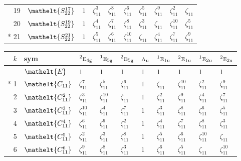 \documentclass[10pt,a4paper]{article}
\numberwithin{equation}{section}
\newcommand{\eltfont}[1]{{\let\sigma\eltsigma\mathelt{#1}}}
\newcommand{\irr}[1]{\text{\normalfont\scshape #1}}
\newcommand{\conjpair}[1]{{}^{#1}}
\newcommand{\cls}[1]{\eltfont{#1}}
\newcommand{\ptag}[1]{\mathrm{#1}}
\newcommand{\rootunity}[1]{\zeta_{#1}}
\begin{document}
{\begin{longtable}{@{}rlllllllll@{}}
19 & $\cls{S_{22}^{17}}$ & $1$ & $\rootunity{11}^{3}$ & $\rootunity{11}^{8}$ & $\rootunity{11}^{6}$ & $\rootunity{11}^{5}$ & $\rootunity{11}^{9}$ & $\rootunity{11}^{2}$ & $\rootunity{11}$\\
20 & $\cls{S_{22}^{19}}$ & $1$ & $\rootunity{11}^{4}$ & $\rootunity{11}^{7}$ & $\rootunity{11}^{8}$ & $\rootunity{11}^{3}$ & $\rootunity{11}$ & $\rootunity{11}^{10}$ & $\rootunity{11}^{5}$\\*
21 & $\cls{S_{22}^{21}}$ & $1$ & $\rootunity{11}^{5}$ & $\rootunity{11}^{6}$ & $\rootunity{11}^{10}$ & $\rootunity{11}$ & $\rootunity{11}^{4}$ & $\rootunity{11}^{7}$ & $\rootunity{11}^{9}$\\
\bottomrule\end{longtable}}
{\small\setlength{\tabcolsep}{4pt}
\begin{longtable}{@{}rlllllllll@{}}\toprule
$k$ & sym & $\conjpair{2}\irr{e}_{4\ptag{g}}$ & $\conjpair{1}\irr{e}_{5\ptag{g}}$ & $\conjpair{2}\irr{e}_{5\ptag{g}}$ & $\irr{a}_{\ptag{u}}$ & $\conjpair{1}\irr{e}_{1\ptag{u}}$ & $\conjpair{2}\irr{e}_{1\ptag{u}}$ & $\conjpair{1}\irr{e}_{2\ptag{u}}$ & $\conjpair{2}\irr{e}_{2\ptag{u}}$\\\midrule\endhead
\bottomrule\endfoot\endlastfoot
0 & $\cls{E}$ & $1$ & $1$ & $1$ & $1$ & $1$ & $1$ & $1$ & $1$\\*
1 & $\cls{C_{11}}$ & $\rootunity{11}^{7}$ & $\rootunity{11}^{5}$ & $\rootunity{11}^{6}$ & $1$ & $\rootunity{11}$ & $\rootunity{11}^{10}$ & $\rootunity{11}^{2}$ & $\rootunity{11}^{9}$\\
2 & $\cls{C_{11}^{2}}$ & $\rootunity{11}^{3}$ & $\rootunity{11}^{10}$ & $\rootunity{11}$ & $1$ & $\rootunity{11}^{2}$ & $\rootunity{11}^{9}$ & $\rootunity{11}^{4}$ & $\rootunity{11}^{7}$\\
3 & $\cls{C_{11}^{3}}$ & $\rootunity{11}^{10}$ & $\rootunity{11}^{4}$ & $\rootunity{11}^{7}$ & $1$ & $\rootunity{11}^{3}$ & $\rootunity{11}^{8}$ & $\rootunity{11}^{6}$ & $\rootunity{11}^{5}$\\
4 & $\cls{C_{11}^{4}}$ & $\rootunity{11}^{6}$ & $\rootunity{11}^{9}$ & $\rootunity{11}^{2}$ & $1$ & $\rootunity{11}^{4}$ & $\rootunity{11}^{7}$ & $\rootunity{11}^{8}$ & $\rootunity{11}^{3}$\\
5 & $\cls{C_{11}^{5}}$ & $\rootunity{11}^{2}$ & $\rootunity{11}^{3}$ & $\rootunity{11}^{8}$ & $1$ & $\rootunity{11}^{5}$ & $\rootunity{11}^{6}$ & $\rootunity{11}^{10}$ & $\rootunity{11}$\\
6 & $\cls{C_{11}^{6}}$ & $\rootunity{11}^{9}$ & $\rootunity{11}^{8}$ & $\rootunity{11}^{3}$ & $1$ & $\rootunity{11}^{6}$ & $\rootunity{11}^{5}$ & $\rootunity{11}$ & $\rootunity{11}^{10}$\\

\end{longtable}}
\end{document}
